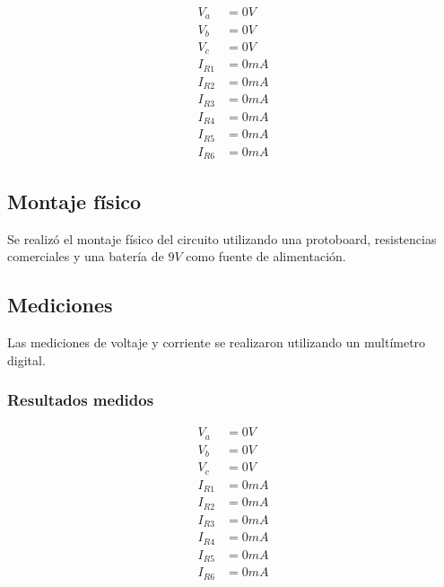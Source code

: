 \documentclass[conference]{IEEEtran}
\begin{document}
\begin{align*}
V_a &= 0V \\
V_b &= 0V \\
V_c &= 0V \\
I_{R1} &= 0mA \\
I_{R2} &= 0mA \\
I_{R3} &= 0mA \\
I_{R4} &= 0mA \\
I_{R5} &= 0mA \\
I_{R6} &= 0mA
\end{align*}

\subsection{Montaje físico}

Se realizó el montaje físico del circuito utilizando una protoboard, resistencias comerciales y una 
batería de $9V$ como fuente de alimentación.

\subsection{Mediciones}

Las mediciones de voltaje y corriente se realizaron utilizando un multímetro digital.

\subsubsection{Resultados medidos}

\begin{align*}
V_a &= 0V \\
V_b &= 0V \\
V_c &= 0V \\
I_{R1} &= 0mA \\
I_{R2} &= 0mA \\
I_{R3} &= 0mA \\
I_{R4} &= 0mA \\
I_{R5} &= 0mA \\
I_{R6} &= 0mA
\end{align*}
\end{document}
